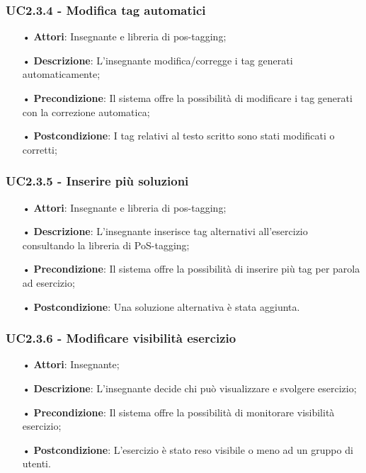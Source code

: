 \subsubsection{UC2.3.4 - Modifica tag automatici}
\begin{itemize}
	\item[•] \textbf{Attori}: Insegnante e libreria di pos-tagging;
	\item[•] \textbf{Descrizione}: L’insegnante modifica/corregge i tag generati automaticamente;
	\item[•] \textbf{Precondizione}: Il sistema offre la possibilità di modificare i tag generati con la correzione automatica;
	\item[•] \textbf{Postcondizione}: I tag relativi al testo scritto sono stati modificati o corretti;
\end{itemize}

\subsubsection{UC2.3.5 - Inserire più soluzioni}
\begin{itemize}
	\item[•] \textbf{Attori}: Insegnante e libreria di pos-tagging;
	\item[•] \textbf{Descrizione}: L'insegnante inserisce tag alternativi all’esercizio consultando la libreria di PoS-tagging;
	\item[•] \textbf{Precondizione}: Il sistema offre la possibilità di inserire più tag per parola ad 
			esercizio;
	\item[•] \textbf{Postcondizione}: Una soluzione alternativa è stata aggiunta.
\end{itemize}

\subsubsection{UC2.3.6 - Modificare visibilità esercizio}
\begin{itemize}
	\item[•] \textbf{Attori}: Insegnante;
	\item[•] \textbf{Descrizione}: L'insegnante decide chi può visualizzare e svolgere esercizio;
	\item[•] \textbf{Precondizione}: Il sistema offre la possibilità di monitorare visibilità esercizio;
	\item[•] \textbf{Postcondizione}: L’esercizio è stato reso visibile o meno ad un gruppo di utenti.
\end{itemize}

